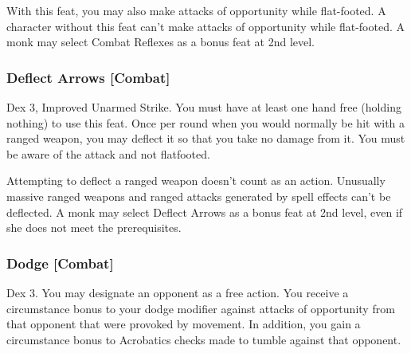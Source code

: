

With this feat, you may also make attacks of opportunity while flat-footed.
 A character without this feat can't make attacks of opportunity while flat-footed.
 A monk may select Combat Reflexes as a bonus feat at 2nd level.


\subsubsection{Deflect Arrows [Combat]}
 Dex 3, Improved Unarmed Strike.
 You must have at least one hand free (holding nothing) to use this feat. Once per round when you would normally be hit with a ranged weapon, you may deflect it so that you take no damage from it. You must be aware of the attack and not flatfooted.
\par Attempting to deflect a ranged weapon doesn't count as an action. Unusually massive ranged weapons and ranged attacks generated by spell effects can't be deflected.
 A monk may select Deflect Arrows as a bonus feat at 2nd level, even if she does not meet the prerequisites.

\subsubsection{Dodge [Combat]}
 Dex 3.
 You may designate an opponent as a free action. You receive a  circumstance bonus to your dodge modifier against attacks of opportunity from that opponent that were provoked by movement. In addition, you gain a  circumstance bonus to Acrobatics checks made to tumble against that opponent.

